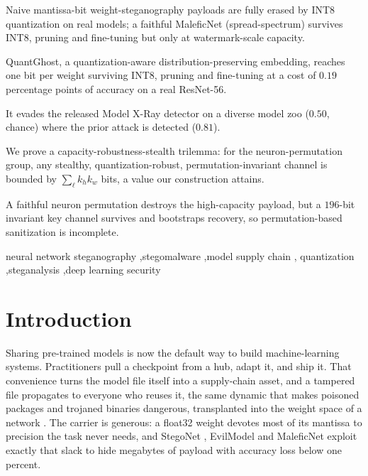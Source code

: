 \documentclass[a4paper,fleqn]{cas-dc}
\theoremstyle{plain}
\theoremstyle{remark}
\newcommand{\sys}{\mbox{QuantGhost}}
\begin{document}
\begin{highlights}
\item Naive mantissa-bit weight-steganography payloads are fully erased by INT8 quantization on real models; a faithful MaleficNet (spread-spectrum) survives INT8, pruning and fine-tuning but only at watermark-scale capacity.
\item \sys, a quantization-aware distribution-preserving embedding, reaches one bit per weight surviving INT8, pruning and fine-tuning at a cost of $0.19$ percentage points of accuracy on a real ResNet-56.
\item It evades the released Model X-Ray detector on a diverse model zoo ($0.50$, chance) where the prior attack is detected ($0.81$).
\item We prove a capacity-robustness-stealth trilemma: for the neuron-permutation group, any stealthy, quantization-robust, permutation-invariant channel is bounded by $\sum_\ell k_h k_w$ bits, a value our construction attains.
\item A faithful neuron permutation destroys the high-capacity payload, but a $196$-bit invariant key channel survives and bootstraps recovery, so permutation-based sanitization is incomplete.
\end{highlights}

\begin{keywords}
neural network steganography \sep stegomalware \sep model supply chain \sep
quantization \sep steganalysis \sep deep learning security
\end{keywords}

\maketitle

\section{Introduction}\label{sec:intro}
Sharing pre-trained models is now the default way to build machine-learning systems.
Practitioners pull a checkpoint from a hub, adapt it, and ship it. That convenience
turns the model file itself into a supply-chain asset, and a tampered file propagates
to everyone who reuses it, the same dynamic that makes poisoned packages and
trojaned binaries dangerous, transplanted into the weight space of a network
\cite{gu2017badnets,liu2018trojaning,digregorio2026insecurity}. The carrier is generous: a float32
weight devotes most of its mantissa to precision the task never needs, and StegoNet
\cite{liu2020stegonet}, EvilModel \cite{wang2021evilmodel,wang2022evilmodel2} and
MaleficNet \cite{hitaj2022maleficnet,hitaj2025trust} exploit exactly that slack to
hide megabytes of payload with accuracy loss below one percent.
\end{document}
